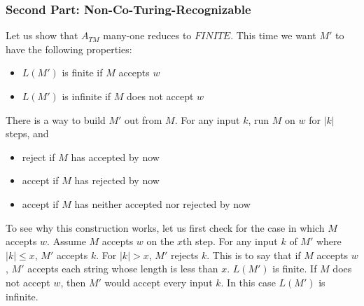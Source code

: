 \documentclass[11pt]{article}
\begin{document}
\subsubsection{Second Part: Non-Co-Turing-Recognizable}

Let us show that $A_{TM}$ many-one reduces to $FINITE$. This time we want $M'$ to have the following
properties:
\begin{itemize}
\item $L(M')$ is finite if $M$ accepts $w$
\item $L(M')$ is infinite if $M$ does not accept $w$
\end{itemize}

There is a way to build $M'$ out from $M$. For any input $k$, run $M$ on $w$ for $|k|$ steps, and
\begin{itemize}
\item reject if $M$ has accepted by now
\item accept if $M$ has rejected by now
\item accept if $M$ has neither accepted nor rejected by now
\end{itemize}

To see why this construction works, let us first check for the case in which $M$ accepts $w$. Assume
$M$ accepts $w$ on the $x$th step. For any input $k$ of $M'$ where $|k| \leq x$, $M'$ accepts $k$.
For $|k| > x$, $M'$ rejects $k$. This is to say that if $M$ accepts $w$, $M'$ accepts each string
whose length is less than $x$. $L(M')$ is finite. If $M$ does not accept $w$, then $M'$ would accept
every input $k$. In this case $L(M')$ is infinite.
\end{document}
